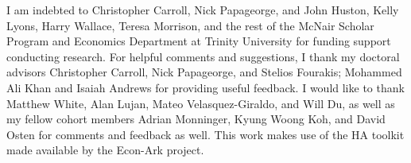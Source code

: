 
I am indebted to Christopher Carroll, Nick Papageorge, and John Huston, Kelly
Lyons, Harry Wallace, Teresa Morrison, and the rest of the McNair Scholar
Program and Economics Department at Trinity University for funding support
conducting research. For helpful comments and suggestions, I thank my doctoral
advisors Christopher Carroll, Nick Papageorge, and Stelios Fourakis; Mohammed Ali Khan and Isaiah Andrews for providing useful feedback. I would
like to thank Matthew White, Alan Lujan, Mateo Velasquez-Giraldo, and Will Du,
as well as my fellow cohort members Adrian Monninger, Kyung Woong Koh, and
David Osten for comments and feedback as well. This work makes use of the HA
toolkit made available by the Econ-Ark project.
